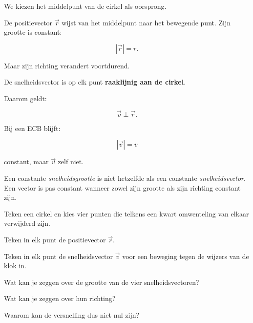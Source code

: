 \documentclass{ximera}
\begin{document}


We kiezen het middelpunt van de cirkel als oorsprong.

De positievector $\vec r$ wijst van het middelpunt naar het bewegende
punt. Zijn grootte is constant:

\[
|\vec r|=r.
\]

Maar zijn richting verandert voortdurend.



De snelheidsvector is op elk punt \textbf{raaklijnig aan de cirkel}.

Daarom geldt:

\[
\boxed{\vec v\perp\vec r}.
\]

Bij een ECB blijft:

\[
|\vec v|=v
\]

constant, maar $\vec v$ zelf niet.

\begin{opmerking}
Een constante \emph{snelheidsgrootte} is niet hetzelfde als een
constante \emph{snelheidsvector}. Een vector is pas constant wanneer
zowel zijn grootte als zijn richting constant zijn.
\end{opmerking}


\begin{oefening}{\oefU\ESS}

Teken een cirkel en kies vier punten die telkens een kwart omwenteling
van elkaar verwijderd zijn.

\begin{question}
Teken in elk punt de positievector $\vec r$.
\end{question}

\begin{question}
Teken in elk punt de snelheidsvector $\vec v$ voor een beweging tegen
de wijzers van de klok in.
\end{question}

\begin{question}
Wat kan je zeggen over de grootte van de vier snelheidsvectoren?
\end{question}

\begin{question}
Wat kan je zeggen over hun richting?
\end{question}

\begin{question}
Waarom kan de versnelling dus niet nul zijn?
\end{question}

\end{oefening}
\end{document}
